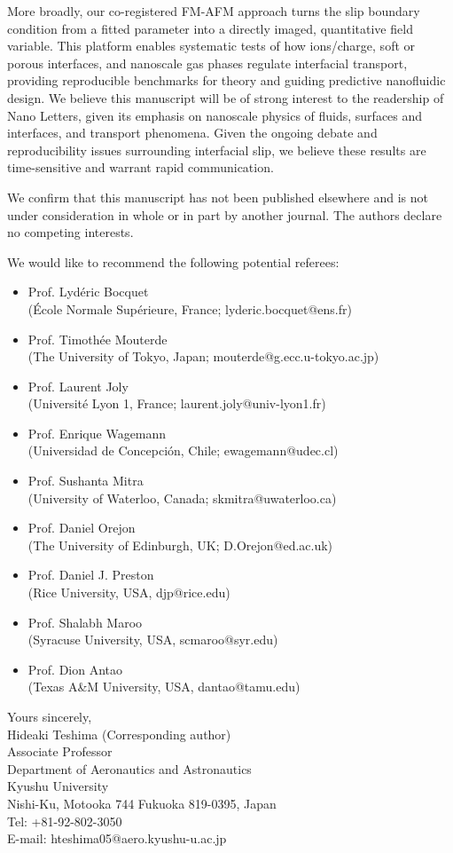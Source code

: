 \documentclass{article}
\begin{document}
More broadly, our co-registered FM-AFM approach turns the slip boundary condition from a fitted parameter into a directly imaged, quantitative field variable. This platform enables systematic tests of how ions/charge, soft or porous interfaces, and nanoscale gas phases regulate interfacial transport, providing reproducible benchmarks for theory and guiding predictive nanofluidic design. We believe this manuscript will be of strong interest to the readership of Nano Letters, given its emphasis on nanoscale physics of fluids, surfaces and interfaces, and transport phenomena. Given the ongoing debate and reproducibility issues surrounding interfacial slip, we believe these results are time-sensitive and warrant rapid communication.

We confirm that this manuscript has not been published elsewhere and is not under consideration in whole or in part by another journal. The authors declare no competing interests.

We would like to recommend the following potential referees: 
\begin{itemize}
\item Prof. Lydéric Bocquet\\
(École Normale Supérieure, France; lyderic.bocquet@ens.fr) 
\item Prof. Timothée Mouterde\\
(The University of Tokyo, Japan; mouterde@g.ecc.u-tokyo.ac.jp) 
\item Prof. Laurent Joly\\
(Université Lyon 1, France; laurent.joly@univ-lyon1.fr)
\item Prof. Enrique Wagemann\\
(Universidad de Concepción, Chile; ewagemann@udec.cl)
\item Prof. Sushanta Mitra\\
(University of Waterloo, Canada; skmitra@uwaterloo.ca)
\item Prof. Daniel Orejon\\
(The University of Edinburgh, UK; D.Orejon@ed.ac.uk)
\item Prof. Daniel J. Preston\\
(Rice University, USA, djp@rice.edu)
\item Prof. Shalabh Maroo\\
(Syracuse University, USA, scmaroo@syr.edu)
\item Prof. Dion Antao\\
(Texas A\&M University, USA, dantao@tamu.edu)
\end{itemize}

Yours sincerely,\\
Hideaki Teshima (Corresponding author)\\
Associate Professor\\
Department of Aeronautics and Astronautics\\
Kyushu University\\
Nishi-Ku, Motooka 744 Fukuoka 819-0395, Japan\\
Tel: +81-92-802-3050\\
E-mail: hteshima05@aero.kyushu-u.ac.jp
\end{document}
